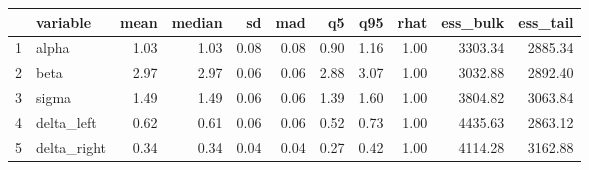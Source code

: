 \begin{table}[ht]
\centering
\begin{tabular}{rlrrrrrrrrr}
  \hline
 & variable & mean & median & sd & mad & q5 & q95 & rhat & ess\_bulk & ess\_tail \\ 
  \hline
1 & alpha & 1.03 & 1.03 & 0.08 & 0.08 & 0.90 & 1.16 & 1.00 & 3303.34 & 2885.34 \\ 
  2 & beta & 2.97 & 2.97 & 0.06 & 0.06 & 2.88 & 3.07 & 1.00 & 3032.88 & 2892.40 \\ 
  3 & sigma & 1.49 & 1.49 & 0.06 & 0.06 & 1.39 & 1.60 & 1.00 & 3804.82 & 3063.84 \\ 
  4 & delta\_left & 0.62 & 0.61 & 0.06 & 0.06 & 0.52 & 0.73 & 1.00 & 4435.63 & 2863.12 \\ 
  5 & delta\_right & 0.34 & 0.34 & 0.04 & 0.04 & 0.27 & 0.42 & 1.00 & 4114.28 & 3162.88 \\ 
   \hline
\end{tabular}
\end{table}
